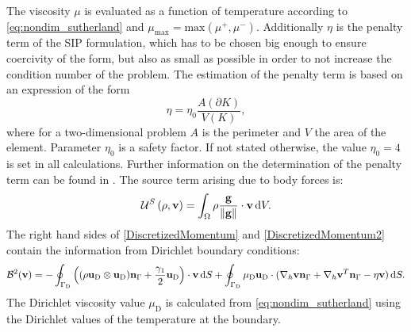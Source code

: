 The viscosity $\mu$ is evaluated as a function of temperature according to \cref{eq:nondim_sutherland} and $\mu_{\text{max}} = \text{max}(\mu^{+}, \mu^{-})$.  Additionally  $\eta$ is the penalty term of the SIP formulation, which has to be chosen big enough to ensure coercivity of the form, but also as small as possible in order to not increase the condition number of the problem. The estimation of the penalty term is based on an expression of the form
\begin{equation}
	\eta = \eta_0 \frac{A(\partial K)}{V(K)},
\end{equation}
where for a two-dimensional problem $A$ is the perimeter and $V$ the area of the element. Parameter $\eta_0$ is a safety factor. If not stated otherwise, the value  $\eta_0 = 4$ is  set in all calculations. Further information on the determination of the penalty term can be found in  \cite{hillewaertDevelopmentDiscontinuousGalerkin2013b}.
The source term arising due to body forces is:
\begin{equation}
	\mathcal{U}^S\left(\rho, \textbf{v}\right) =  \int_{\Omega}{  \rho \frac{\textbf{g}}{\Vert \textbf{g} \Vert}\cdot \textbf{v}} \,\mathrm{d} V.  \label{eq:Mom_source}
\end{equation}
The right hand sides of \cref{DiscretizedMomentum} and \cref{DiscretizedMomentum2} contain the information from Dirichlet boundary conditions:
\begin{equation}
	\mathcal{B}^2(\textbf{v}) =
	-\oint_{\Gamma_{\text{D}}}{ \left( (\rho\textbf{u}_{\text{D}}\otimes\textbf{u}_{\text{D}} )\textbf{n}_{\Gamma} + \frac{\gamma_1}{2}\textbf{u}_{\text{D}}\right)\cdot\textbf{v} \,\mathrm{d} S}  +
	\oint_{\Gamma_{\text{D}}}{\mu_{\text{D}}\textbf{u}_{\text{D}}\cdot(\nabla_h\textbf{v} \textbf{n}_{\Gamma} + \nabla_h\textbf{v}^T \textbf{n}_{\Gamma}- \eta \textbf{v} )\,\mathrm{d} S.}
\end{equation}
The Dirichlet viscosity value $\mu_{\text{D}}$ is calculated from \cref{eq:nondim_sutherland} using the Dirichlet values of the temperature at the boundary.
